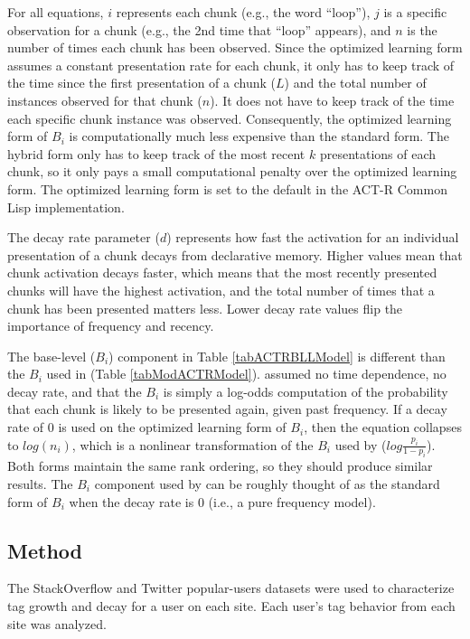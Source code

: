 \documentclass[man,floatsintext,donotrepeattitle]{apa6}
\begin{document}
For all equations, $i$ represents each chunk (e.g., the word ``loop''), $j$ is a specific observation for a chunk (e.g., the 2nd time that ``loop'' appears), and $n$ is the number of times each chunk has been observed.
Since the optimized learning form assumes a constant presentation rate for each chunk,
it only has to keep track of the time since the first presentation of a chunk ($L$) and the total number of instances observed for that chunk ($n$). 
It does not have to keep track of the time each specific chunk instance was observed.
Consequently, the optimized learning form of $B_{i}$ is computationally much less expensive than the standard form.
The hybrid form only has to keep track of the most recent $k$ presentations of each chunk, so it only pays a small computational penalty over the optimized learning form.
The optimized learning form is set to the default in the ACT-R Common Lisp implementation.

The decay rate parameter ($d$) represents how fast the activation for an individual presentation of a chunk decays from declarative memory.
Higher values mean that chunk activation decays faster, which means that the most recently presented chunks will have the highest activation, and the total number of times that a chunk has been presented matters less.
Lower decay rate values flip the importance of frequency and recency.

The base-level ($B_{i}$) component in Table \ref{tabACTRBLLModel} is different than the $B_{i}$ used in \textcite{Stanley2013} (Table \ref{tabModACTRModel}).
\citeauthor{Stanley2013} assumed no time dependence, no decay rate, and that the $B_{i}$ is simply a log-odds computation of the probability that each chunk is likely to be presented again, given past frequency.
If a decay rate of 0 is used on the optimized learning form of $B_{i}$, then the equation collapses to $log \left ( n_{i} \right )$,
which is a nonlinear transformation of the $B_{i}$ used by \citeauthor{Stanley2013} ($log \frac{p_{i}}{1-p_{i}}$).
Both forms maintain the same rank ordering, so they should produce similar results.
The $B_{i}$ component used by \citeauthor{Stanley2013} can be roughly thought of as the standard form of $B_{i}$ when the decay rate is 0 (i.e., a pure frequency model).

\subsection{Method}

The StackOverflow and Twitter popular-users datasets were used to characterize tag growth and decay for a user on each site.
Each user's tag behavior from each site was analyzed. 
\end{document}
